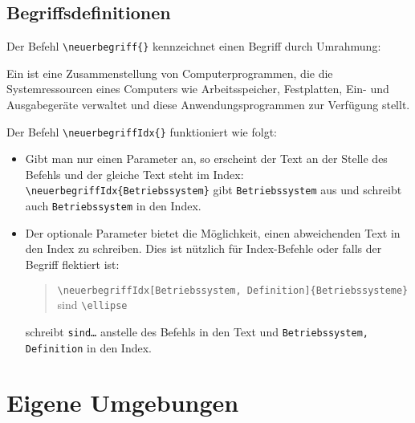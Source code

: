		\section{Begriffsdefinitionen}
			\label{begriffsdefinitionen}
			Der Befehl \verb|\neuerbegriff{}| kennzeichnet einen Begriff durch Umrahmung:
			\begin{quotex}
				Ein  ist eine Zusammenstellung von Computerprogrammen, die die Systemressourcen eines Computers wie Arbeitsspeicher, Festplatten, Ein- und Ausgabegeräte verwaltet und diese Anwendungsprogrammen zur Verfügung stellt. 
			\end{quotex}
			Der Befehl \verb|\neuerbegriffIdx{}| funktioniert wie folgt:
			\begin{itemize}
				\item Gibt man nur einen Parameter an, so erscheint der Text an der Stelle des Befehls und der gleiche Text steht im Index: \verb|\neuerbegriffIdx{Betriebssystem}| gibt \texttt{Betriebssystem} aus und schreibt auch \texttt{Betriebssystem} in den Index.
				\item Der optionale Parameter bietet die Möglichkeit, einen abweichenden Text in den Index zu schreiben. Dies ist nützlich für Index-Befehle oder falls der Begriff flektiert ist:
					\begin{quote}
						\verb|\neuerbegriffIdx[Betriebssystem, Definition]{Betriebssysteme}| sind \verb|\ellipse|
					\end{quote}
				schreibt  \texttt{sind\ldots} anstelle des Befehls in den Text und \texttt{Betriebssystem, Definition} in den Index.
			\end{itemize}




	\chapter{Eigene Umgebungen}
